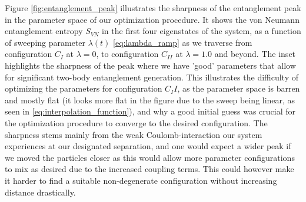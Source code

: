 \documentclass{subfiles}
\begin{document}
Figure \ref{fig:entanglement_peak} illustrates the sharpness of the entanglement peak in the parameter space of our optimization procedure. It shows the von Neumann entanglement entropy $S_{VN}$ in the first four eigenstates of the system, as a function of sweeping parameter $\lambda(t)$ \eqref{eq:lambda_ramp} as we traverse from configuration $C_I$ at $\lambda = 0$, to configuration $C_{II}$ at $\lambda = 1.0$ and beyond. The inset highlights the sharpness of the peak where we have 'good' parameters that allow for significant two-body entanglement generation. This illustrates the difficulty of optimizing the parameters for configuration $C_II$, as the parameter space is barren and mostly flat (it looks more flat in the figure due to the sweep being linear, as seen in \eqref{eq:interpolation_function}), and why a good initial guess was crucial for the optimization procedure to converge to the desired configuration. The sharpness stems mainly from the weak Coulomb-interaction our system experiences at our designated separation, and one would expect a wider peak if we moved the particles closer as this would allow more parameter configurations to mix as desired due to the increased coupling terms. This could however make it harder to find a suitable non-degenerate configuration without increasing distance drastically. 
\end{document}
